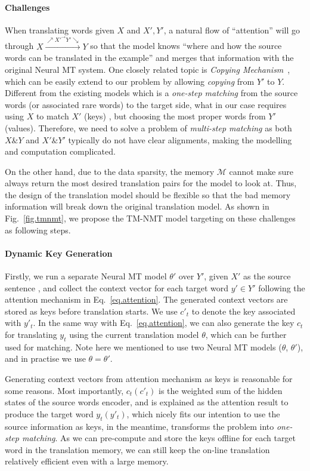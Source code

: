 \documentclass[11pt,letterpaper]{article}
\begin{document}
\paragraph{Challenges}
When translating words given $X$ and $X', Y'$, a natural flow of ``attention'' will go through $X \xrightarrow{\nearrow X'^{\rightarrow}Y' \searrow} Y$ so that the model knows ``where and how the source words can be translated in the example'' and merges that information with the original Neural MT system. One closely related topic is \textit{Copying Mechanism}~\cite{gu2016incorporating,gulcehre2016pointing}, which can be easily extend to our problem by allowing \textit{copying} from $Y'$ to $Y$. Different from the existing models which is a \textit{one-step matching}  from the source words (or associated rare words) to the target side,  what in our case requires using $X$ to match $X'$ (keys) , but choosing the most proper words from $Y'$ (values).  Therefore, we need to solve a problem of \textit{multi-step matching} as both $X \& Y$ and $X' \& Y'$ typically do not have clear alignments, making the modelling and computation complicated.

On the other hand, due to the data sparsity, the memory $\mathcal{M}$ cannot make sure always return the most desired translation pairs for the model to look at. Thus, the design of the translation model should be flexible so that the bad memory information will break down the original translation model. As shown in Fig.~\ref{fig.tmnmt}, we propose the TM-NMT model  targeting on these challenges as following steps. 
\paragraph{Dynamic Key Generation}
Firstly, we  run a separate Neural MT model $\theta'$ over $Y'$, given $X'$ as the source sentence , and collect the context vector for each target word $y'\in Y'$ following the attention mechanism in Eq.~\ref{eq.attention}. The generated context vectors are stored as keys before translation starts.  We use $c'_t$ to denote the key associated with $y'_t$.  
In the same way with Eq.~\ref{eq.attention}, we can also generate the key $c_t$  for translating $y_t$ using the current translation model $\theta$, which can be further used for matching. Note here we mentioned to use two Neural MT models ($\theta$, $\theta'$), and in practise we use $\theta=\theta'$.

Generating context vectors from attention mechanism as keys is reasonable for some reasons. Most importantly,  $c_t (c'_t)$ is the weighted sum of the hidden states of the source words encoder, and is explained as the attention result to produce the target word $y_t (y'_t)$, which nicely fits our intention to use the source information as keys, in the meantime, transforms the problem into \textit{one-step matching}.  As we can pre-compute and store the keys offline for each target word in the translation memory, we can still keep the on-line translation relatively efficient even with a large memory.
\end{document}
